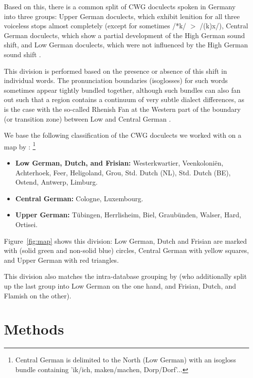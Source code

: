 \documentclass[a4paper]{article}
\begin{document}
Based on this, there is a common split
of CWG doculects spoken in Germany into three groups:
Upper German doculects, which exhibit lenition for
all three voiceless stops almost completely
(except for sometimes /*k/ $>$ /(k)x/),
Central German doculects, which show a
partial development of the High German sound shift,
and Low German doculects,
which were not influenced by the High German sound shift
\citep[pp. 33, 55]{noble1983modern}.

This division is performed based on
the presence or absence of this shift in individual words.
The pronunciation boundaries (isoglosses) for such words
sometimes appear tightly bundled together,
although such bundles can also fan out such that a region
contains a continuum of very subtle dialect differences,
as is the case with the so-called Rhenish Fan at the Western part
of the boundary (or transition zone) between Low and Central German
\citep[pp. 63, 138, 141]{koenig2015dtv}.

We base the following classification of
the CWG doculects we worked with
on a map by \citet[pp. 230-231]{koenig2015dtv}:
\footnote{
Central German is delimited %
to the North (Low German) with an isogloss bundle containing
'ik/ich, maken/machen, Dorp/Dorf'...
}

\begin{itemize}
\item
\textbf{Low German, Dutch, and Frisian:}
Westerkwartier, Veenkoloni\"{e}n, Achterhoek,
Feer, Heligoland, Grou,
Std. Dutch (NL), Std. Dutch (BE), Ostend, Antwerp, Limburg.

\item
\textbf{Central German:}
Cologne, Luxembourg.

\item
\textbf{Upper German:}
T\"{u}bingen, Herrlisheim,
Biel, Graub\"{u}nden, Walser, Hard, Ortisei.
\end{itemize}

Figure~\ref{fig:map} shows this division:
Low German, Dutch and Frisian are marked with (solid green and non-solid blue) circles,
Central German with yellow squares, and Upper German with red triangles.

This division also matches the intra-database grouping by \citet{heggarty2018sound}
(who additionally split up the last group into
Low German on the one hand,
and Frisian, Dutch, and Flamish on the other).

\section{Methods}
\label{sec:methods}
\end{document}
